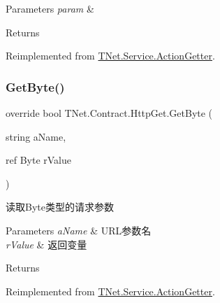 \begin{DoxyParams}{Parameters}
{\em param} & \\
\hline
\end{DoxyParams}
\begin{DoxyReturn}{Returns}

\end{DoxyReturn}


Reimplemented from \mbox{\hyperlink{class_t_net_1_1_service_1_1_action_getter_aba2682659a54a8750b520f9f00fe9961}{T\+Net.\+Service.\+Action\+Getter}}.

\mbox{\label{class_t_net_1_1_contract_1_1_http_get_a4f28c7438a62cd67378d8558b8974a41}} 
\subsubsection{\texorpdfstring{Get\+Byte()}{GetByte()}\hspace{0.1cm}{\footnotesize\ttfamily [2/3]}}
{\footnotesize\ttfamily override bool T\+Net.\+Contract.\+Http\+Get.\+Get\+Byte (\begin{DoxyParamCaption}\item[{string}]{a\+Name,  }\item[{ref Byte}]{r\+Value }\end{DoxyParamCaption})\hspace{0.3cm}{\ttfamily [virtual]}}



读取\+Byte类型的请求参数 


\begin{DoxyParams}{Parameters}
{\em a\+Name} & U\+R\+L参数名\\
\hline
{\em r\+Value} & 返回变量\\
\hline
\end{DoxyParams}
\begin{DoxyReturn}{Returns}

\end{DoxyReturn}


Reimplemented from \mbox{\hyperlink{class_t_net_1_1_service_1_1_action_getter_a3f5ed08dbd854214ed136221ea4f113e}{T\+Net.\+Service.\+Action\+Getter}}.

\mbox{\label{class_t_net_1_1_contract_1_1_http_get_a99dfa18e03bf43ac3dd539ea0d0f5ee6}} 
